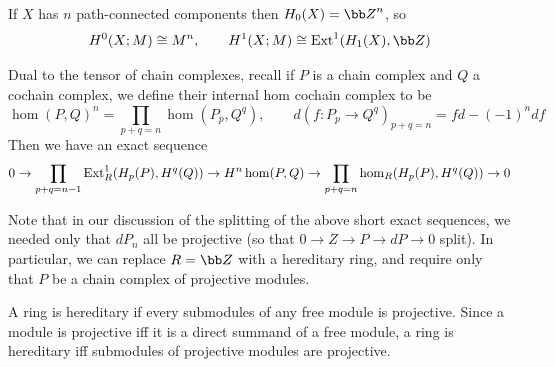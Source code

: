     If $X$ has $n$ path-connected components then $H_0(X)=\bZ^n$, so
    $$ H^0(X;M) \cong M^n,\qquad H^1(X;M) \cong \ext^1(H_1(X),\bZ) $$

\eexam

Dual to the tensor of chain complexes, recall if $P$ is a chain complex and $Q$ a cochain complex, we define their {\emphcolor internal hom cochain complex} to be
$$ \hom(P,Q)^n = \prod_{p+q=n}\hom(P_p,Q^q),\qquad d(f\colon P_p\to Q^q)_{p+q=n} = fd - (-1)^ndf $$
Then we have an exact sequence
$$ 0 \to \prod_{p+q=n-1}{\rm Ext}^1_R(H_p(P),H^q(Q)) \to H^n\hom(P,Q) \to \prod_{p+q=n}\hom_R(H_p(P),H^q(Q)) \to 0 $$

Note that in our discussion of the splitting of the above short exact sequences, we needed only that $dP_n$ all be projective (so that $0\to Z\to P\to dP\to0$ split).
In particular, we can replace $R=\bZ$ with a {\emphcolor hereditary} ring, and require only that $P$ be a chain complex of projective modules.

\bdefn

    A ring is {\emphcolor hereditary} if every submodules of any free module is projective.
    Since a module is projective iff it is a direct summand of a free module, a ring is hereditary iff submodules of projective modules are projective.

\edefn

